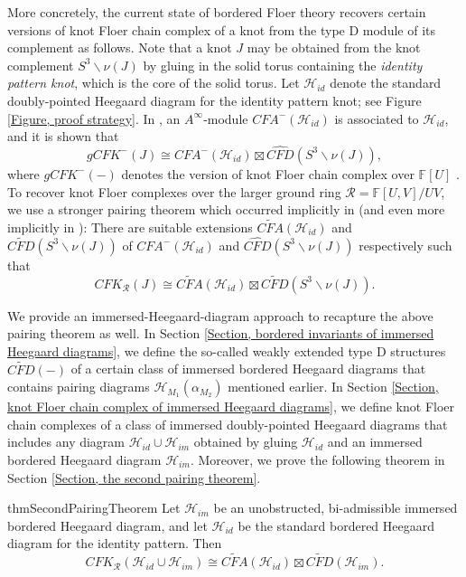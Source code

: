 \documentclass{amsart}
\theoremstyle{definition}
\theoremstyle{remark}
\numberwithin{equation}{section}
\numberwithin{equation}{section} \makeatletter
\begin{document}
More concretely, the current state of bordered Floer theory recovers certain versions of knot Floer chain complex of a knot from the type D module of its complement as follows. Note that a knot $J$ may be obtained from the knot complement $S^3\backslash \nu(J) $ by gluing in the solid torus containing the \textit{identity pattern knot}, which is the core of the solid torus. Let $\mathcal{H}_{id}$ denote the standard doubly-pointed Heegaard diagram for the identity pattern knot; see Figure \ref{Figure, proof strategy}. In \cite{LOT18}, an $A^{\infty}$-module $CFA^-(\mathcal{H}_{id})$ is associated to $\mathcal{H}_{id}$, and it is shown that $$gCFK^-(J)\cong CFA^-(\mathcal{H}_{id})\boxtimes \widehat{CFD}(S^3\backslash \nu(J)),$$ where $gCFK^-(-)$ denotes the version of knot Floer chain complex over $\mathbb{F}[U]$ \cite[Theorem 11.9]{LOT18}. To recover knot Floer complexes over the larger ground ring $\mathcal{R}=\mathbb{F}[U,V]/UV$, we use a stronger pairing theorem which occurred implicitly in \cite{Hanselman2022} (and even more implicitly in \cite{LOT18}): There are suitable extensions $\widetilde{CFA}(\mathcal{H}_{id})$ and $\widetilde{CFD}(S^3\backslash \nu(J))$ of ${CFA^-}(\mathcal{H}_{id})$ and $\widehat{CFD}(S^3\backslash \nu(J))$ respectively such that $$CFK_{\mathcal{R}}(J)\cong \widetilde{CFA}(\mathcal{H}_{id})\boxtimes \widetilde{CFD}(S^3\backslash \nu(J)).$$

We provide an immersed-Heegaard-diagram approach to recapture the above pairing theorem as well. In Section \ref{Section, bordered invariants of immersed Heegaard diagrams}, we define the so-called weakly extended type D structures $\widetilde{CFD}(-)$ of a certain class of immersed bordered Heegaard diagrams that contains pairing diagrams $\mathcal{H}_{M_1}(\alpha_{M_2})$ mentioned earlier. In Section \ref{Section, knot Floer chain complex of immersed Heegaard diagrams}, we define knot Floer chain complexes of a class of immersed doubly-pointed Heegaard diagrams that includes any diagram $\mathcal{H}_{id}\cup \mathcal{H}_{im}$ obtained by gluing $\mathcal{H}_{id}$ and an immersed bordered Heegaard diagram $\mathcal{H}_{im}$.  Moreover, we prove the following theorem in Section \ref{Section, the second pairing theorem}.

\begin{restatable}{thm}{SecondPairingTheorem}\label{Theorem, 2nd pairing theorem}
	Let $\mathcal{H}_{im}$ be an unobstructed, bi-admissible immersed bordered Heegaard diagram, and let $\mathcal{H}_{id}$ be the standard bordered Heegaard diagram for the identity pattern. Then  
	$$CFK_{\mathcal{R}}(\mathcal{H}_{id}\cup \mathcal{H}_{im})\cong \widetilde{CFA}(\mathcal{H}_{id})\boxtimes \widetilde{CFD}(\mathcal{H}_{im}).$$
\end{restatable}
\end{document}
